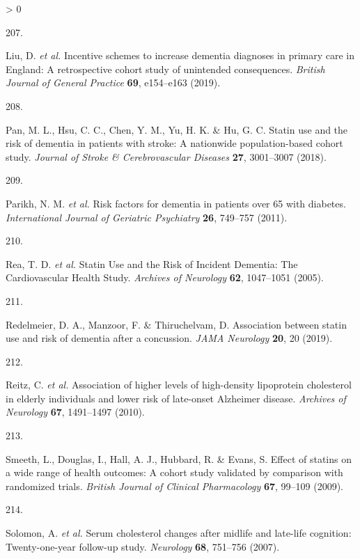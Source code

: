 \documentclass[a4paper, twoside]{templates/ociamthesis}
\newlength{\cslhangindent}
\newlength{\csllabelwidth}
\newenvironment{CSLReferences}[3] %
 {%
  \setlength{\parindent}{0pt}
  \ifodd #1 \everypar{\setlength{\hangindent}{\cslhangindent}}\ignorespaces\fi
  \ifnum #2 > 0
  \setlength{\parskip}{#2\baselineskip}
  \fi
 }%
 {}
\newcommand{\CSLLeftMargin}[1]{\parbox[t]{\maxof{\widthof{#1}}{\csllabelwidth}}{#1}}
\newcommand{\CSLRightInline}[1]{\parbox[t]{\linewidth - \csllabelwidth}{#1}}
\begin{document}
\begin{CSLReferences}{0}{0}
\leavevmode\hypertarget{ref-liu2019}{}%
\CSLLeftMargin{207. }
\CSLRightInline{Liu, D. \emph{et al.} Incentive schemes to increase dementia diagnoses in primary care in {England}: A retrospective cohort study of unintended consequences. \emph{British Journal of General Practice} \textbf{69}, e154--e163 (2019).}

\leavevmode\hypertarget{ref-pan2018}{}%
\CSLLeftMargin{208. }
\CSLRightInline{Pan, M. L., Hsu, C. C., Chen, Y. M., Yu, H. K. \& Hu, G. C. Statin use and the risk of dementia in patients with stroke: A nationwide population-based cohort study. \emph{Journal of Stroke \& Cerebrovascular Diseases} \textbf{27}, 3001--3007 (2018).}

\leavevmode\hypertarget{ref-parikh2011}{}%
\CSLLeftMargin{209. }
\CSLRightInline{Parikh, N. M. \emph{et al.} Risk factors for dementia in patients over 65 with diabetes. \emph{International Journal of Geriatric Psychiatry} \textbf{26}, 749--757 (2011).}

\leavevmode\hypertarget{ref-rea2005}{}%
\CSLLeftMargin{210. }
\CSLRightInline{Rea, T. D. \emph{et al.} Statin {Use} and the {Risk} of {Incident Dementia}: The {Cardiovascular Health Study}. \emph{Archives of Neurology} \textbf{62}, 1047--1051 (2005).}

\leavevmode\hypertarget{ref-redelmeier2019}{}%
\CSLLeftMargin{211. }
\CSLRightInline{Redelmeier, D. A., Manzoor, F. \& Thiruchelvam, D. Association between statin use and risk of dementia after a concussion. \emph{JAMA Neurology} \textbf{20}, 20 (2019).}

\leavevmode\hypertarget{ref-reitz2010}{}%
\CSLLeftMargin{212. }
\CSLRightInline{Reitz, C. \emph{et al.} Association of higher levels of high-density lipoprotein cholesterol in elderly individuals and lower risk of late-onset {Alzheimer} disease. \emph{Archives of Neurology} \textbf{67}, 1491--1497 (2010).}

\leavevmode\hypertarget{ref-smeeth2009}{}%
\CSLLeftMargin{213. }
\CSLRightInline{Smeeth, L., Douglas, I., Hall, A. J., Hubbard, R. \& Evans, S. Effect of statins on a wide range of health outcomes: A cohort study validated by comparison with randomized trials. \emph{British Journal of Clinical Pharmacology} \textbf{67}, 99--109 (2009).}

\leavevmode\hypertarget{ref-solomon2007}{}%
\CSLLeftMargin{214. }
\CSLRightInline{Solomon, A. \emph{et al.} Serum cholesterol changes after midlife and late-life cognition: Twenty-one-year follow-up study. \emph{Neurology} \textbf{68}, 751--756 (2007).}


\end{CSLReferences}
\end{document}

